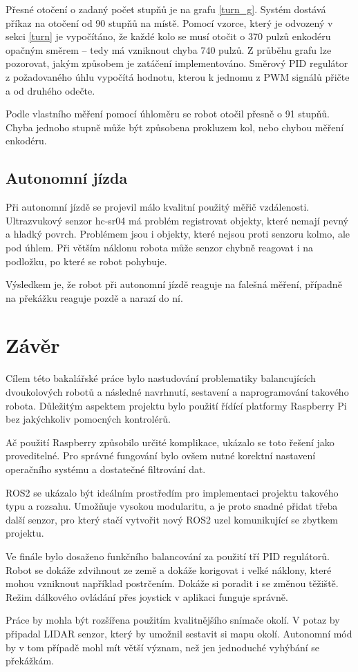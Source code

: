 Přesné otočení o zadaný počet stupňů je na grafu \ref{turn_g}. Systém dostává příkaz na otočení od 90 stupňů na místě. Pomocí vzorce, který je odvozený v sekci \ref{turn} je vypočítáno, že každé kolo se musí otočit o 370 pulzů enkodéru opačným směrem -- tedy má vzniknout chyba 740 pulzů. Z průběhu grafu lze pozorovat, jakým způsobem je zatáčení implementováno. Směrový PID regulátor z požadovaného úhlu vypočítá hodnotu, kterou k jednomu z PWM signálů přičte a od druhého odečte. 

Podle vlastního měření pomocí úhloměru se robot otočil přesně o 91 stupňů. Chyba jednoho stupně může být způsobena prokluzem kol, nebo chybou měření enkodéru.

\section{Autonomní jízda}
Při autonomní jízdě se projevil málo kvalitní použitý měřič vzdálenosti. Ultrazvukový senzor hc-sr04 má problém registrovat objekty, které nemají pevný a hladký povrch. Problémem jsou i objekty, které nejsou proti senzoru kolmo, ale pod úhlem. Při větším náklonu robota může senzor chybně reagovat i na podložku, po které se robot pohybuje.

Výsledkem je, že robot při autonomní jízdě reaguje na falešná měření, případně na překážku reaguje pozdě a narazí do ní.


\chapter{Závěr}
\label{chap7}

Cílem této bakalářské práce bylo nastudování problematiky balancujících dvoukolových robotů a následné navrhnutí, sestavení a naprogramování takového robota. Důležitým aspektem projektu bylo použití řídící platformy Raspberry Pi bez jakýchkoliv pomocných kontrolérů.

Ač použití Raspberry způsobilo určité komplikace, ukázalo se toto řešení jako proveditelné. Pro správné fungování bylo ovšem nutné korektní nastavení operačního systému a dostatečné filtrování dat.

ROS2 se ukázalo být ideálním prostředím pro implementaci projektu takového typu a rozsahu. Umožňuje vysokou modularitu, a je proto snadné přidat třeba další senzor, pro který stačí vytvořit nový ROS2 uzel komunikující se zbytkem projektu.

Ve finále bylo dosaženo funkčního balancování za použití tří PID regulátorů. Robot se dokáže zdvihnout ze země a dokáže korigovat i velké náklony, které mohou vzniknout například postrčením. Dokáže si poradit i se změnou těžiště. Režim dálkového ovládání přes joystick v aplikaci funguje správně.

Práce by mohla být rozšířena použitím kvalitnějšího snímače okolí. V potaz by připadal LIDAR senzor, který by umožnil sestavit si mapu okolí. Autonomní mód by v tom případě mohl mít větší význam, než jen jednoduché vyhýbání se překážkám.


%
